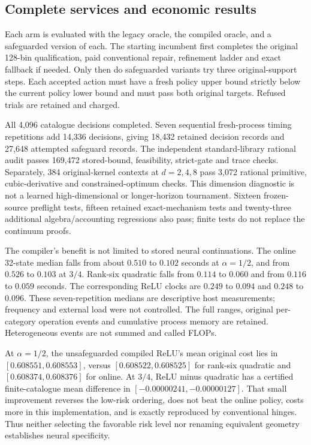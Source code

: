 \subsection{Complete services and economic results}
Each arm is evaluated with the legacy oracle, the compiled oracle, and a safeguarded version of each. The starting incumbent first completes the original 128-bin qualification, paid conventional repair, refinement ladder and exact fallback if needed. Only then do safeguarded variants try three original-support steps. Each accepted action must have a fresh policy upper bound strictly below the current policy lower bound and must pass both original targets. Refused trials are retained and charged.




All 4,096 catalogue decisions completed. Seven sequential fresh-process timing repetitions add 14,336 decisions, giving 18,432 retained decision records and 27,648 attempted safeguard records. The independent standard-library rational audit passes 169,472 stored-bound, feasibility, strict-gate and trace checks. Separately, 384 original-kernel contexts at $d=2,4,8$ pass 3,072 rational primitive, cubic-derivative and constrained-optimum checks. This dimension diagnostic is not a learned high-dimensional or longer-horizon tournament. Sixteen frozen-source preflight tests, fifteen retained exact-mechanism tests and twenty-three additional algebra/accounting regressions also pass; finite tests do not replace the continuum proofs.

The compiler's benefit is not limited to stored neural continuations. The online 32-state median falls from about $0.510$ to $0.102$ seconds at $\alpha=1/2$, and from $0.526$ to $0.103$ at $3/4$. Rank-six quadratic falls from $0.114$ to $0.060$ and from $0.116$ to $0.059$ seconds. The corresponding ReLU clocks are $0.249$ to $0.094$ and $0.248$ to $0.096$. These seven-repetition medians are descriptive host measurements; frequency and external load were not controlled. The full ranges, original per-category operation events and cumulative process memory are retained. Heterogeneous events are not summed and called FLOPs.

At $\alpha=1/2$, the unsafeguarded compiled ReLU's mean original cost lies in $[0.608551,0.608553]$, versus $[0.608522,0.608525]$ for rank-six quadratic and $[0.608374,0.608376]$ for online. At $3/4$, ReLU minus quadratic has a certified finite-catalogue mean difference in $[-0.00000241,-0.00000127]$. That small improvement reverses the low-risk ordering, does not beat the online policy, costs more in this implementation, and is exactly reproduced by conventional hinges. Thus neither selecting the favorable risk level nor renaming equivalent geometry establishes neural specificity.

